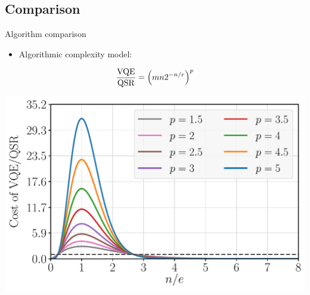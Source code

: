 
\subsection{Comparison}

\begin{frame}[allowframebreaks]{Algorithm comparison}

  \vspace{2em}
  \begin{itemize}
    \item Algorithmic complexity model:
  \end{itemize}
  \vspace{-2em}
  \begin{gather*}
    \frac{\textnormal{VQE}}{\textnormal{QSR}} = \qty(m n 2^{-n/r})^{p}
  \end{gather*}

  \vspace{-1em}
  \begin{multicols}{2}

    \begin{center}
      \includegraphics[width=.40\paperwidth]{Figures/chapter05/VQE-vs-QSR_p}
    \end{center}

    \columnbreak


\end{multicols}
\end{frame}
